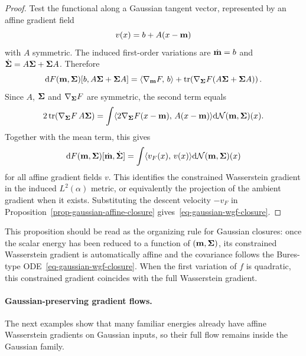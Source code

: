 \begin{proof}
	Test the functional along a Gaussian tangent vector, represented by an affine gradient field
	\[
		v(x)=b+A(x-\mathbf{m})
	\]
	with $A$ symmetric. The induced first-order variations are $\dot{\mathbf{m}}=b$ and $\dot{\mathbf{\Sigma}}=A\mathbf{\Sigma}+\mathbf{\Sigma} A$. Therefore
	\[
		\mathrm{d} F(\mathbf{m},\mathbf{\Sigma})[b,A\mathbf{\Sigma}+\mathbf{\Sigma} A]
		=
		\langle \nabla_{\mathbf{m}} F,\,b\rangle
		+
		\mathrm{tr}\!\left(\nabla_{\mathbf{\Sigma}} F(A\mathbf{\Sigma}+\mathbf{\Sigma} A)\right).
	\]
	Since $A$, $\mathbf{\Sigma}$ and $\nabla_{\mathbf{\Sigma}} F$ are symmetric, the second term equals
	\[
		2\,\mathrm{tr}(\nabla_{\mathbf{\Sigma}} F\,A\mathbf{\Sigma})
		=
		\int \langle 2\nabla_{\mathbf{\Sigma}} F(x-\mathbf{m}),\,A(x-\mathbf{m})\rangle\mathrm{d}\mathcal{N}(\mathbf{m},\mathbf{\Sigma})(x).
	\]
	Together with the mean term, this gives
	\[
		\mathrm{d} F(\mathbf{m},\mathbf{\Sigma})[\dot{\mathbf{m}},\dot{\mathbf{\Sigma}}]
		=
		\int \langle v_F(x),\,v(x)\rangle\mathrm{d}\mathcal{N}(\mathbf{m},\mathbf{\Sigma})(x)
	\]
	for all affine gradient fields $v$. This identifies the constrained Wasserstein gradient in the induced $L^2(\alpha)$ metric, or equivalently the projection of the ambient gradient when it exists. Substituting the descent velocity $-v_F$ in Proposition~\ref{prop-gaussian-affine-closure} gives~\eqref{eq-gaussian-wgf-closure}.
\end{proof}

This proposition should be read as the organizing rule for Gaussian closures: once the scalar energy has been reduced to a function of $(\mathbf{m},\mathbf{\Sigma})$, its constrained Wasserstein gradient is automatically affine and the covariance follows the Bures-type ODE~\eqref{eq-gaussian-wgf-closure}. When the first variation of $f$ is quadratic, this constrained gradient coincides with the full Wasserstein gradient.

\paragraph{Gaussian-preserving gradient flows.}

The next examples show that many familiar energies already have affine Wasserstein gradients on Gaussian inputs, so their full flow remains inside the Gaussian family.

